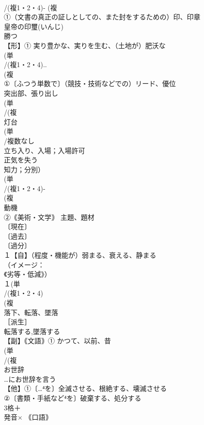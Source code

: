 \documentclass[8pt]{extreport}
\begin{document}
\begin{CJK}{UTF8}{min}
\\	/(複1・2・4)- (複
\\	①（文書の真正の証しとしての、また封をするための）印、印章 
\\	皇帝の印璽(いんじ) 
\\	勝つ
\\	【形】① 実り豊かな、実りを生む、（土地が）肥沃な
\\	(単
\\	/(複1・2・4)..
\\	(複
\\	①〔ふつう単数で〕（競技・技術などでの）リード、優位 
\\	突出部、張り出し
\\	(単
\\	/(複
\\	灯台 
\\	(単
\\	/複数なし 
\\	立ち入り、入場；入場許可 
\\	正気を失う 
\\	知力；分別）
\\	(単
\\	/(複1・2・4)-
\\	(複
\\	動機 
\\	②｟美術・文学｠ 主題、題材
\\	〔現在〕
\\	〔過去〕
\\	〔過分〕
\\	１【自】（程度・機能が）弱まる、衰える、静まる 
\\	（イメージ：
\\	《劣等・低減》）
\\	１(単
\\	/(複1・2・4)
\\	(複
\\	落下、転落、墜落 
\\	［派生］ 
\\	転落する,墜落する
\\	【副】｟文語｠① かつて、以前、昔 
\\	(単
\\	/(複
\\	お世辞 
\\	…にお世辞を言う 
\\	【他】①〔…⁴を〕全滅させる、根絶する、壊滅させる 
\\	②〔書類・手紙など⁴を〕破棄する、処分する
\\	3格＋
\\	発音×	｟口語｠ 

\end{CJK}
\end{document}
